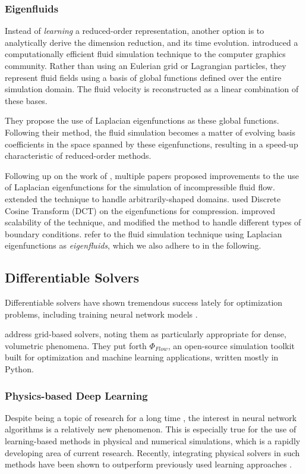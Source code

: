 \subsubsection*{Eigenfluids}
Instead of \textit{learning} a reduced-order representation, another option is
to analytically derive the dimension reduction, and its time evolution.
\citet{dewitt} introduced a computationally efficient fluid simulation technique
to the computer graphics community. Rather than using an Eulerian grid or
Lagrangian particles, they represent fluid fields using a basis of global
functions defined over the entire simulation domain. The fluid velocity is
reconstructed as a linear combination of these bases.

They propose the use of Laplacian eigenfunctions as these global functions.
Following their method, the fluid simulation becomes a matter of evolving basis
coefficients in the space spanned by these eigenfunctions, resulting in
a speed-up characteristic of reduced-order methods. 

Following up on the work of \citet{dewitt}, multiple papers proposed
improvements to the use of Laplacian eigenfunctions for the simulation of
incompressible fluid flow. \citet{ModelReductionFluidSim} extended the technique
to handle arbitrarily-shaped domains. \citet{EigenfluidCompression} used Discrete
Cosine Transform (DCT) on the eigenfunctions for compression.
\citet{scalable-eigenfluids} improved scalability of the technique, and modified
the method to handle different types of boundary conditions.
\citet{scalable-eigenfluids} refer to the fluid simulation technique using
Laplacian eigenfunctions as \textit{eigenfluids}, which we also adhere to in the
following.

\subsection{Differentiable Solvers}
Differentiable solvers have shown tremendous success lately for optimization
problems, including training neural network models
\cite{holl2019pdecontrol, difftaichi, warp2022}.

\citet{holl2019pdecontrol} address grid-based solvers, noting them as
particularly appropriate for dense, volumetric phenomena. They put forth
$\Phi_{Flow}$, an open-source simulation toolkit built for optimization and
machine learning applications, written mostly in Python.

\subsubsection*{Physics-based Deep Learning}
Despite being a topic of research for a long time \cite{backprop}, the
interest in neural network algorithms is a relatively new phenomenon. This is
especially true for the use of learning-based methods in physical and numerical
simulations, which is a rapidly developing area of current research. Recently,
integrating physical solvers in such methods have been shown to outperform
previously used learning approaches \cite{solver-in-the-loop}.

